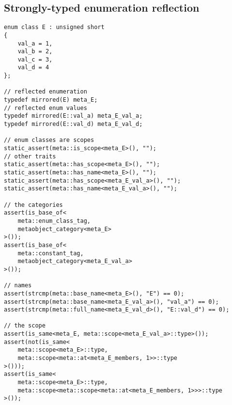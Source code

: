\subsection{Strongly-typed enumeration reflection}

\begin{verbatim}
enum class E : unsigned short
{
	val_a = 1,
	val_b = 2,
	val_c = 3,
	val_d = 4
};

// reflected enumeration
typedef mirrored(E) meta_E;
// reflected enum values
typedef mirrored(E::val_a) meta_E_val_a;
typedef mirrored(E::val_d) meta_E_val_d;

// enum classes are scopes
static_assert(meta::is_scope<meta_E>(), "");
// other traits
static_assert(meta::has_scope<meta_E>(), "");
static_assert(meta::has_name<meta_E>(), "");
static_assert(meta::has_scope<meta_E_val_a>(), "");
static_assert(meta::has_name<meta_E_val_a>(), "");

// the categories
assert(is_base_of<
	meta::enum_class_tag,
	metaobject_category<meta_E>
>());
assert(is_base_of<
	meta::constant_tag,
	metaobject_category<meta_E_val_a>
>());

// names
assert(strcmp(meta::base_name<meta_E>(), "E") == 0);
assert(strcmp(meta::base_name<meta_E_val_a>(), "val_a") == 0);
assert(strcmp(meta::full_name<meta_E_val_d>(), "E::val_d") == 0);

// the scope
assert(is_same<meta_E, meta::scope<meta_E_val_a>::type>());
assert(not(is_same<
	meta::scope<meta_E>::type,
	meta::scope<meta::at<meta_E_members, 1>>::type
>()));
assert(is_same<
	meta::scope<meta_E>::type,
	meta::scope<meta::scope<meta::at<meta_E_members, 1>>>::type
>());

\end{verbatim}

